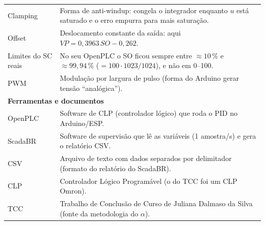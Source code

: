 \documentclass[11pt,a4paper]{article}
\begin{document}
\begin{center}
\begin{longtable}{p{2.7cm}p{12.3cm}}
Clamping & Forma de anti-windup: congela o integrador enquanto $u$ está saturado e o erro empurra para mais saturação.\\
Offset & Deslocamento constante da saída: aqui $VP=0{,}3963\,SO-0{,}262$.\\
Limites do SC reais & No seu OpenPLC o SO ficou sempre entre $\approx10\,\%$ e $\approx99{,}94\,\%$ ($=100\cdot1023/1024$), e não em 0--100.\\
PWM & Modulação por largura de pulso (forma do Arduino gerar tensão ``analógica'').\\
\multicolumn{2}{l}{\textbf{Ferramentas e documentos}}\\
OpenPLC & Software de CLP (controlador lógico) que roda o PID no Arduino/ESP.\\
ScadaBR & Software de supervisão que lê as variáveis (1 amostra/s) e gera o relatório CSV.\\
CSV & Arquivo de texto com dados separados por delimitador (formato do relatório do ScadaBR).\\
CLP & Controlador Lógico Programável (o do TCC foi um CLP Omron).\\
TCC & Trabalho de Conclusão de Curso de Juliana Dalmaso da Silva (fonte da metodologia do $\alpha$).\\
\bottomrule
\end{longtable}\end{center}
\end{document}
